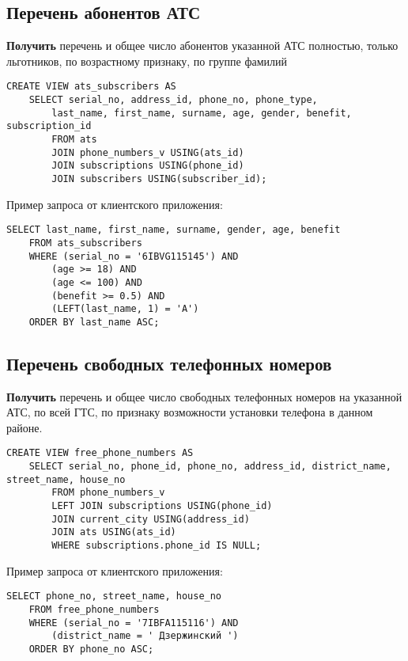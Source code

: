 \documentclass{report}
\begin{document}
\subsection{Перечень абонентов АТС}

\textbf{Получить} перечень и общее число абонентов указанной АТС полностью, 
только льготников, по возрастному признаку, по группе фамилий

\begin{lstlisting}
CREATE VIEW ats_subscribers AS
    SELECT serial_no, address_id, phone_no, phone_type, 
        last_name, first_name, surname, age, gender, benefit, subscription_id
        FROM ats
        JOIN phone_numbers_v USING(ats_id)
        JOIN subscriptions USING(phone_id)
        JOIN subscribers USING(subscriber_id);
\end{lstlisting}

Пример запроса от клиентского приложения:

\begin{lstlisting}
SELECT last_name, first_name, surname, gender, age, benefit
	FROM ats_subscribers
	WHERE (serial_no = '6IBVG115145') AND
		(age >= 18) AND
		(age <= 100) AND
		(benefit >= 0.5) AND
		(LEFT(last_name, 1) = 'А')
	ORDER BY last_name ASC;
\end{lstlisting}

\subsection{Перечень свободных телефонных номеров}

\textbf{Получить} перечень и общее число свободных телефонных 
номеров на указанной АТС, по всей ГТС, по признаку возможности установки 
телефона в данном районе.

\begin{lstlisting}
CREATE VIEW free_phone_numbers AS
    SELECT serial_no, phone_id, phone_no, address_id, district_name, street_name, house_no
        FROM phone_numbers_v
        LEFT JOIN subscriptions USING(phone_id)
        JOIN current_city USING(address_id)
        JOIN ats USING(ats_id)
        WHERE subscriptions.phone_id IS NULL;
\end{lstlisting}

Пример запроса от клиентского приложения:

\begin{lstlisting}
SELECT phone_no, street_name, house_no
	FROM free_phone_numbers
	WHERE (serial_no = '7IBFA115116') AND
		(district_name = ' Дзержинский ')
	ORDER BY phone_no ASC;
\end{lstlisting}
\end{document}
